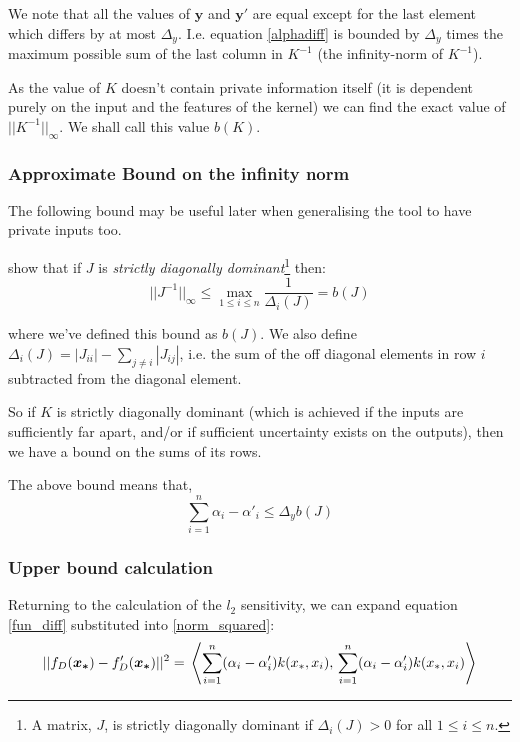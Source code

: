 \documentclass[a4paper]{article}
\begin{document}
\begin{multicols}{2}
We note that all the values of $\bm{y}$ and $\bm{y}'$ are equal except for the last element which differs by at most $\Delta_y$. I.e. equation \ref{alphadiff} is bounded by $\Delta_y$ times the maximum possible sum of the last column in $K^{-1}$ (the infinity-norm of $K^{-1}$).

As the value of $K$ doesn't contain private information itself (it is dependent purely on the input and the features of the kernel) we can find the exact value of $||K^{-1}||_\infty$. We shall call this value $b(K)$.

\subsubsection{Approximate Bound on the infinity norm}
The following bound may be useful later when generalising the tool to have private inputs too.

\citet{varah1975lower} show that if $J$ is \emph{strictly diagonally dominant}\footnote{A matrix, $J$, is strictly diagonally dominant if $\Delta_i(J) > 0$ for all $1 \leq i \leq n$.} then:
$$||J^{-1}||_\infty \leq \max\limits_{1 \leq i \leq n} \frac{1}{\Delta_i(J)} = b(J)$$

where we've defined this bound as $b(J)$. We also define $\Delta_i(J) = |J_{ii}| - \sum_{j \neq i} |J_{ij}|$, i.e. the sum of the off diagonal elements in row $i$ subtracted from the diagonal element. 

So if $K$ is strictly diagonally dominant (which is achieved if the inputs are sufficiently far apart, and/or if sufficient uncertainty exists on the outputs), then we have a bound on the sums of its rows.

The above bound means that,
\begin{dmath}
\sum_{i=1}^n \alpha_i - \alpha'_i \leq \Delta_y b(J)
\end{dmath}

\subsubsection{Upper bound calculation}

Returning to the calculation of the $l_2$ sensitivity, we can expand equation \ref{fun_diff} substituted into \ref{norm_squared}:
\begin{dmath}
||f_D(\bm{x_*}) - f_D'(\bm{x_*})||^2 = \\ \left\langle \sum_{i=1}^n (\alpha_i - \alpha'_i) k(x_*,x_i), \\ \sum_{i=1}^n (\alpha_i - \alpha'_i) k(x_*,x_i) \right\rangle
\end{dmath}


\end{multicols}
\end{document}
